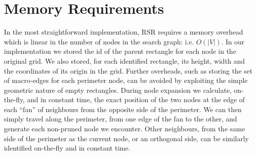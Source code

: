 \section{Memory Requirements}
\label{sec:memory}
In the most straightforward implementation, RSR requires a memory overhead which
is linear in the number of nodes in the search graph: i.e. $O(|V|)$.
In our implementation we stored the id of the parent rectangle for each node in 
the original grid. We also stored, for each identified rectangle, its height, width 
and the coordinates of its origin in the grid. 
Further overheads, such as storing the set of macro-edges for each perimeter
node, can be avoided by exploiting the simple geometric nature of empty
rectangles. 
During node expansion we calculate, on-the-fly, and in constant time, the exact position of 
the two nodes at the edge of each ``fan'' of neighbours from the opposite side of the perimeter. 
We can then simply travel along the perimeter, from one edge of
the fan to the other, and generate each non-pruned node we encounter.
Other neighbours, from the same side of the perimeter as the current node, or an orthogonal side, 
can be similarly identified on-the-fly and in constant time.
